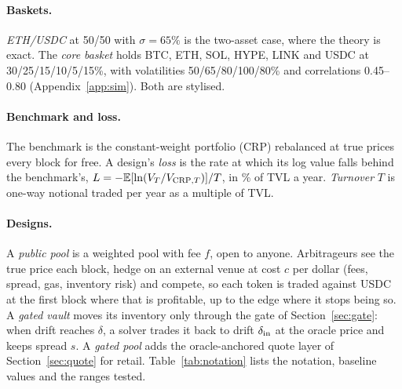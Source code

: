 \paragraph{Baskets.} \emph{ETH/USDC} at 50/50 with $\sigma=65\%$ is the two-asset case, where the theory is exact. The \emph{core basket} holds BTC, ETH, SOL, HYPE, LINK and USDC at 30/25/15/10/5/15\%, with volatilities 50/65/80/100/80\% and correlations 0.45--0.80 (Appendix~\ref{app:sim}). Both are stylised.

\paragraph{Benchmark and loss.} The benchmark is the constant-weight portfolio (CRP) rebalanced at true prices every block for free. A design's \emph{loss} is the rate at which its log value falls behind the benchmark's, $L=-\mathbb{E}[\ln(V_T/V_{\mathrm{CRP},T})]/T$, in \% of TVL a year. \emph{Turnover} $T$ is one-way notional traded per year as a multiple of TVL.

\paragraph{Designs.} A \emph{public pool} is a weighted pool with fee $f$, open to anyone. Arbitrageurs see the true price each block, hedge on an external venue at cost $c$ per dollar (fees, spread, gas, inventory risk) and compete, so each token is traded against USDC at the first block where that is profitable, up to the edge where it stops being so. A \emph{gated vault} moves its inventory only through the gate of Section~\ref{sec:gate}: when drift reaches $\delta$, a solver trades it back to drift $\delta_{\mathrm{in}}$ at the oracle price and keeps spread $s$. A \emph{gated pool} adds the oracle-anchored quote layer of Section~\ref{sec:quote} for retail. Table~\ref{tab:notation} lists the notation, baseline values and the ranges tested.

